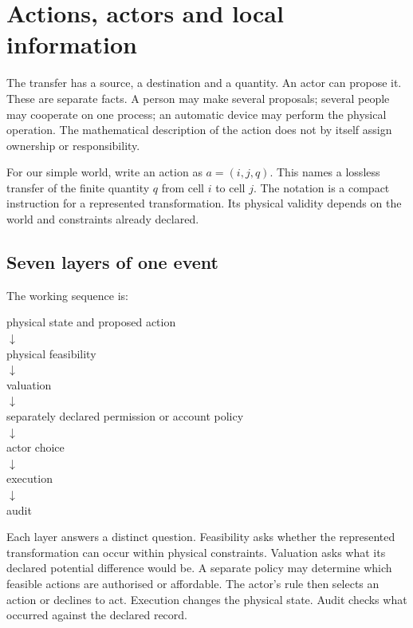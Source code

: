 \chapter{Actions, actors and local information}\label{ch:actors}

The transfer has a source, a destination and a quantity. An actor can propose it. These are separate facts. A person may make several proposals; several people may cooperate on one process; an automatic device may perform the physical operation. The mathematical description of the action does not by itself assign ownership or responsibility.

For our simple world, write an action as $a=(i,j,q)$. This names a lossless transfer of the finite quantity $q$ from cell $i$ to cell $j$. The notation is a compact instruction for a represented transformation. Its physical validity depends on the world and constraints already declared.

\section{Seven layers of one event}
The working sequence is:

\begin{center}\small
physical state and proposed action\\$\downarrow$\\
physical feasibility\\$\downarrow$\\
valuation\\$\downarrow$\\
separately declared permission or account policy\\$\downarrow$\\
actor choice\\$\downarrow$\\
execution\\$\downarrow$\\
audit
\end{center}

Each layer answers a distinct question. Feasibility asks whether the represented transformation can occur within physical constraints. Valuation asks what its declared potential difference would be. A separate policy may determine which feasible actions are authorised or affordable. The actor's rule then selects an action or declines to act. Execution changes the physical state. Audit checks what occurred against the declared record.


